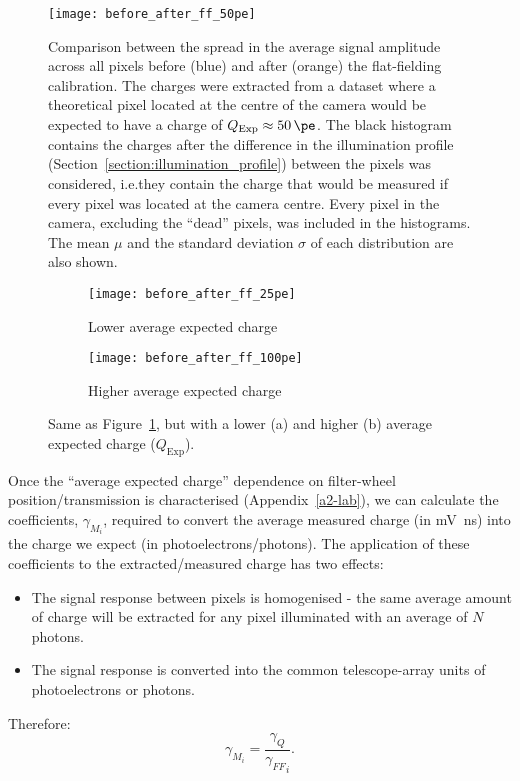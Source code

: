 \begin{figure}
	\centering
    \texttt{[image: before\_after\_ff\_50pe]} 
	\caption[Flat-field residuals.]{Comparison between the spread in the average signal amplitude across all pixels before (blue) and after (orange) the flat-fielding calibration. The charges were extracted from a dataset where a theoretical pixel located at the centre of the camera would be expected to have a charge of $Q_\text{Exp} \approx \SI{50}{\pe}$. The black histogram contains the charges after the difference in the illumination profile (Section~\ref{section:illumination_profile}) between the pixels was considered, i.e.\@ they contain the charge that would be measured if every pixel was located at the camera centre. Every pixel in the camera, excluding the ``dead'' pixels, was included in the histograms. The mean $\mu$ and the standard deviation $\sigma$ of each distribution are also shown.}
	\label{fig:before_after_ff_50pe}
\end{figure}

\begin{figure}
  \begin{subfigure}[b]{0.49\textwidth}
    \texttt{[image: before\_after\_ff\_25pe]}
    \caption{Lower average expected charge}
    \label{fig:before_after_ff_25pe}
  \end{subfigure}
  \hfill
  \begin{subfigure}[b]{0.49\textwidth}
    \texttt{[image: before\_after\_ff\_100pe]}
    \caption{Higher average expected charge}
    \label{fig:before_after_ff_100pe}
  \end{subfigure}
  \caption[Flat-field residuals at other illuminations.]{Same as Figure~\ref{fig:before_after_ff_50pe}, but with a lower (a) and higher (b) average expected charge ($Q_\text{Exp}$).}
\end{figure}

Once the ``average expected charge'' dependence on filter-wheel position/transmission is characterised (Appendix~\ref{a2-lab}), we can calculate the coefficients, $\gamma_{M_i}$, required to convert the average measured charge (in \si{mV ns}) into the charge we expect (in photoelectrons/photons). The application of these coefficients to the extracted/measured charge has two effects:
\begin{itemize}
\item The signal response between pixels is homogenised - the same average amount of charge will be extracted for any pixel illuminated with an average of $N$ photons.
\item The signal response is converted into the common telescope-array units of photoelectrons or photons.
\end{itemize}
Therefore:
\begin{equation} \label{eq:ff}
\gamma_{M_i} = \frac{\gamma_Q}{{\gamma_{FF}}_i}.
\end{equation}


